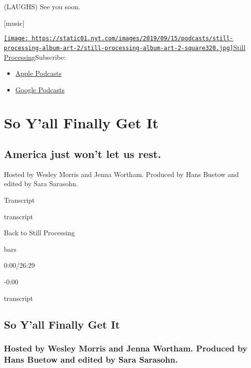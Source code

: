 (LAUGHS) See you soon.

{[}music{]}

\href{https://www.nytimes.com/column/still-processing-podcast}{\texttt{[image: https://static01.nyt.com/images/2019/09/15/podcasts/still-processing-album-art-2/still-processing-album-art-2-square320.jpg]}Still
Processing}Subscribe:

\begin{itemize}
\tightlist
\item
  \href{https://itunes.apple.com/us/podcast/id1151436460}{Apple
  Podcasts}
\item
  \href{https://www.google.com/podcasts?feed=aHR0cHM6Ly9yc3MuYXJ0MTkuY29tL255dC1zdGlsbC1wcm9jZXNzaW5n}{Google
  Podcasts}
\end{itemize}

\hypertarget{so-yall-finally-get-it-1}{%
\section{So Y'all Finally Get It}\label{so-yall-finally-get-it-1}}

\hypertarget{america-just-wont-let-us-rest-1}{%
\subsection{America just won't let us
rest.}\label{america-just-wont-let-us-rest-1}}

Hosted by Wesley Morris and Jenna Wortham. Produced by Hans Buetow and
edited by Sara Sarasohn.

Transcript

transcript

Back to Still Processing

bars

0:00/26:29

-0:00

transcript

\hypertarget{so-yall-finally-get-it-2}{%
\subsection{So Y'all Finally Get It}\label{so-yall-finally-get-it-2}}

\hypertarget{hosted-by-wesley-morris-and-jenna-wortham-produced-by-hans-buetow-and-edited-by-sara-sarasohn-1}{%
\subsubsection{Hosted by Wesley Morris and Jenna Wortham. Produced by
Hans Buetow and edited by Sara
Sarasohn.}\label{hosted-by-wesley-morris-and-jenna-wortham-produced-by-hans-buetow-and-edited-by-sara-sarasohn-1}}

